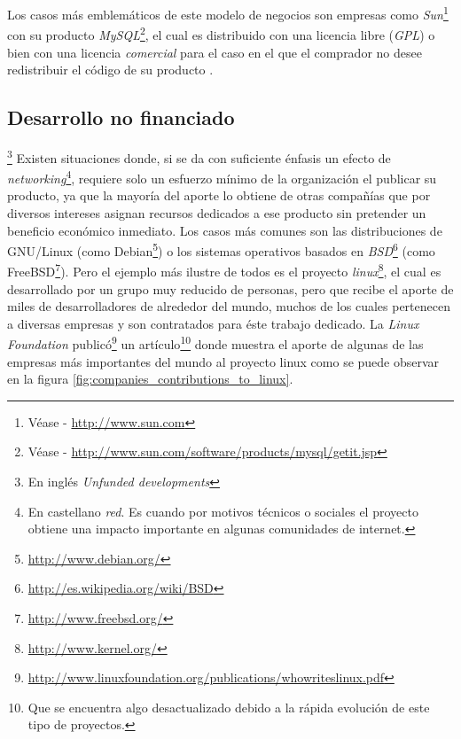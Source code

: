 Los casos m\'as emblem\'aticos de este modelo de negocios son empresas como
\emph{Sun}\footnote{V\'ease - \url{http://www.sun.com}} con su producto
\emph{MySQL}\footnote{
V\'ease - \url{http://www.sun.com/software/products/mysql/getit.jsp}}, el cual
es distribuido con una licencia libre (\emph{GPL}) o bien con una licencia
\emph{comercial} para el caso en el que el comprador no desee redistribuir el
c\'odigo de su producto	.

\subsection{Desarrollo no financiado}\footnote{En ingl\'es \emph{Unfunded
developments}}
%
Existen situaciones donde, si se da con suficiente \'enfasis un efecto de
\emph{networking}\footnote{En castellano \emph{red}. Es cuando por motivos
t\'ecnicos o sociales el proyecto obtiene una impacto importante en 
algunas comunidades de internet.}, requiere solo un esfuerzo m\'inimo de la
organizaci\'on el publicar su producto, ya que la mayor\'ia del aporte lo
obtiene de otras compa\~n\'ias que por diversos intereses asignan recursos
dedicados a ese producto sin pretender un beneficio econ\'omico inmediato.
Los casos m\'as comunes son las distribuciones de GNU/Linux (como
Debian\footnote{\url{http://www.debian.org/}}) o los sistemas operativos
basados en \emph{BSD}\footnote{\url{http://es.wikipedia.org/wiki/BSD}} (como
FreeBSD\footnote{\url{http://www.freebsd.org/}}). Pero el ejemplo m\'as
ilustre de todos es el proyecto
\emph{linux}\footnote{\url{http://www.kernel.org/}}, el cual es desarrollado
por un grupo muy reducido de personas, pero que recibe el aporte de miles de
desarrolladores de alrededor del mundo, muchos de los cuales pertenecen a
diversas empresas y son contratados para \'este trabajo dedicado.
La \emph{Linux Foundation}
public\'o\footnote{\url{
http://www.linuxfoundation.org/publications/whowriteslinux.pdf}} un
art\'iculo\footnote{Que se encuentra algo desactualizado debido a la r\'apida
evoluci\'on de este tipo de proyectos.} donde muestra el aporte de algunas de
las empresas m\'as importantes del mundo al proyecto linux como se puede
observar en la figura \ref{fig:companies_contributions_to_linux}.

